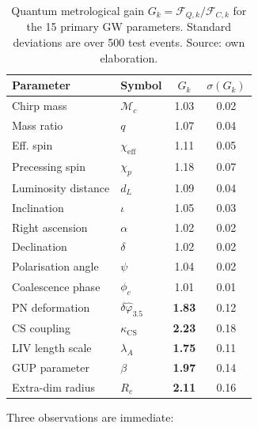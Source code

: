\documentclass[11pt,a4paper, english]{book}
\theoremstyle{plain}
\theoremstyle{definition}
\numberwithin{equation}{chapter}
\numberwithin{figure}{chapter}
\numberwithin{table}{chapter}
\begin{document}
\begin{table}[ht]
\centering
\begin{tabular}{@{}llcc@{}}
\toprule
\textbf{Parameter} & \textbf{Symbol} & $G_k$ & $\sigma(G_k)$ \\
\midrule
Chirp mass            & $\mathcal{M}_c$ & 1.03 & 0.02 \\
Mass ratio            & $q$             & 1.07 & 0.04 \\
Eff. spin             & $\chi_\mathrm{eff}$ & 1.11 & 0.05 \\
Precessing spin       & $\chi_p$        & 1.18 & 0.07 \\
Luminosity distance   & $d_L$           & 1.09 & 0.04 \\
Inclination           & $\iota$         & 1.05 & 0.03 \\
Right ascension       & $\alpha$        & 1.02 & 0.02 \\
Declination           & $\delta$        & 1.02 & 0.02 \\
Polarisation angle    & $\psi$          & 1.04 & 0.02 \\
Coalescence phase     & $\phi_c$        & 1.01 & 0.01 \\
PN deformation        & $\delta\hat{\varphi}_{3.5}$ & \textbf{1.83} & 0.12 \\
CS coupling           & $\kappa_\mathrm{CS}$ & \textbf{2.23} & 0.18 \\
LIV length scale      & $\lambda_A$     & \textbf{1.75} & 0.11 \\
GUP parameter         & $\beta$         & \textbf{1.97} & 0.14 \\
Extra-dim radius      & $R_c$           & \textbf{2.11} & 0.16 \\
\bottomrule
\end{tabular}
\caption[Quantum metrological gains for GW parameters]{Quantum metrological gain $G_k = \mathcal{F}_{Q,k}/\mathcal{F}_{C,k}$
         for the 15 primary GW parameters.  Standard deviations are over
         500 test events. Source: own elaboration.}
\label{tab:qmg-parameters}
\vspace{2pt}
\normalsize

\end{table}

Three observations are immediate:
\end{document}
